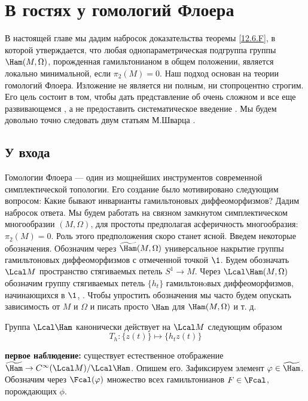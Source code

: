 \chapter[Гомологии Флоера]{В гостях у гомологий Флоера}\label{sec:13}

В настоящей главе мы дадим набросок доказательства теоремы
\ref{12.6.F}, в которой утверждается, что любая однопараметрическая
подгруппа группы $\Ham(M, \Omega)$, порожденная гамильтонианом в общем
положении, является локально минимальной, если $π_{2}(M) = 0$.
Наш подход основан на теории гомологий Флоера. Изложение не является
ни полным, ни стопроцентно строгим.
Его цель состоит в том, чтобы дать представление об очень сложном и
все еще развивающемся , а не
предоставить систематическое введение .
Мы будем довольно точно следовать двум статьям М.Шварца \cite{Sch2,
  Sch3}.

\section{У входа}\label{sec:13.1}

Гомологии Флоера --- один из мощнейших инструментов современной
симплектической топологии. 
Его создание было мотивировано следующим вопросом: Какие бывают инварианты
гамильтоновых диффеоморфизмов?
Дадим набросок ответа.
Мы будем работать на связном замкнутом симплектическом многообразии
$(M,\Omega)$, для простоты предполагая асферичность многообразия:
$π_{2}(M) = 0$.
Роль этого предположения скоро станет ясной.
Введем некоторые обозначения.
Обозначим через $\widetilde\Ham(M,\Omega)$ универсальное накрытие
группы гамильтоновых диффеоморфизмов с отмеченной точкой $\1$.
Будем обозначать $\Lcal M$ пространство стягиваемых петель $S^{1}\to
M$.
Через $\Lcal\Ham(M,\Omega)$ обозначим группу стягиваемых петель
$\{h_{t}\}$ гамильтонoвых диффеоморфизмов, начинающихся в $\1$,
.
Чтобы упростить обозначения мы часто будем опускать зависимость от $M$
и $\Omega$ и писать просто $\Ham$ для $\Ham(M, \Omega)$ и т. д. 

Группа $\Lcal\Ham$ канонически действует на $\Lcal M$
следующим образом
\[
T_{h}: \{z(t)\}\mapsto \{h_{t}z(t)\}
\]

  
\noindent\textbf{первое наблюдение:} существует естественное
отображение $\widetilde\Ham\to C^{\infty}(\Lcal M)/\Lcal\Ham$.
Опишем его. Зафиксируем элемент $\phi\in\widetilde\Ham$. Обозначим
через $\Fcal(\phi)$ множество всех гамильтонианов $F\in\Fcal$,
порождающих $\phi$.

